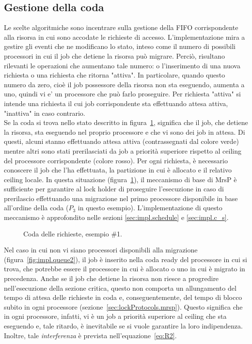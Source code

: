 \subsection{Gestione della coda}
\label{sec:impl.queue}

Le scelte algoritmiche sono incentrare sulla gestione della FIFO corrispondente alla risorsa in cui sono accodate le richieste di accesso. L'implementazione mira a gestire gli eventi che ne modificano lo stato, inteso come il numero di possibili processori in cui il job che detiene la risorsa può migrare. Perciò, risultano rilevanti le operazioni che aumentano tale numero: o l'inserimento di una nuova richiesta o una richiesta che ritorna "attiva". In particolare, quando questo numero da zero, cioè il job possessore della risorsa non sta eseguendo, aumenta a uno, quindi vi e' un processore che può farlo proseguire. Per richiesta "attiva" si intende una richiesta il cui job corrispondente sta effettuando attesa attiva, "inattiva" in caso contrario.\\

Se la coda si trova nello stato descritto in figura~\ref{fig:impl.queue1}, significa che il job, che detiene la risorsa, sta eseguendo nel proprio processore e che vi sono dei job in attesa. Di questi, alcuni stanno effettuando attesa attiva (contrassegnati dal colore verde) mentre altri sono stati prerilasciati da job a priorità superiore rispetto al ceiling del processore corrispondente (colore rosso). Per ogni richiesta, è necessario conoscere il job che l'ha effettuata, la partizione in cui è allocato e il relativo ceiling locale.  In questa situazione (figura~\ref{fig:impl.queue1}), il meccanismo di base di MrsP è sufficiente per garantire al lock holder di proseguire l'esecuzione in caso di prerilascio effettuando una migrazione nel primo processore disponibile in base all'ordine della coda ($P_3$ in questo esempio). L'implementazione di questo meccanismo è approfondito nelle sezioni \ref{sec:impl.schedule} e \ref{sec:impl.c_s}.\\

\begin{figure}
\centering
{}
\caption{Coda delle richieste, esempio \#1.}
\label{fig:impl.queue1}
\end{figure}

Nel caso in cui non vi siano processori disponibili alla migrazione (figura~\ref{fig:impl.queue2}), il job è inserito nella coda ready del processore in cui si trova, che potrebbe essere il processore in cui è allocato o uno in cui è migrato in precedenza. Anche se il job che detiene la risorsa non riesce a progredire nell'esecuzione della sezione critica, questo non comporta un allungamento del tempo di attesa delle richieste in coda e, conseguentemente, del tempo di blocco subito in ogni processore (sezione~\ref{sec:lockProtocols.mrsp}). Questo significa che in ogni processore, infatti, vi è un job a priorità superiore al ceiling che sta eseguendo e, tale ritardo, è inevitabile se si vuole garantire la loro indipendenza. Inoltre, tale \textit{interferenza} è prevista nell'equazione~\ref{eq:R2}.\\

